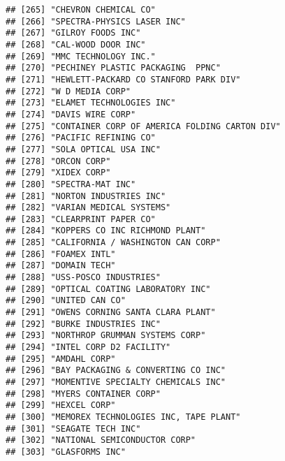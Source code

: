\documentclass[
]{book}
\begin{document}
\begin{verbatim}
## [265] "CHEVRON CHEMICAL CO"                                     
## [266] "SPECTRA-PHYSICS LASER INC"                               
## [267] "GILROY FOODS INC"                                        
## [268] "CAL-WOOD DOOR INC"                                       
## [269] "MMC TECHNOLOGY INC."                                     
## [270] "PECHINEY PLASTIC PACKAGING  PPNC"                        
## [271] "HEWLETT-PACKARD CO STANFORD PARK DIV"                    
## [272] "W D MEDIA CORP"                                          
## [273] "ELAMET TECHNOLOGIES INC"                                 
## [274] "DAVIS WIRE CORP"                                         
## [275] "CONTAINER CORP OF AMERICA FOLDING CARTON DIV"            
## [276] "PACIFIC REFINING CO"                                     
## [277] "SOLA OPTICAL USA INC"                                    
## [278] "ORCON CORP"                                              
## [279] "XIDEX CORP"                                              
## [280] "SPECTRA-MAT INC"                                         
## [281] "NORTON INDUSTRIES INC"                                   
## [282] "VARIAN MEDICAL SYSTEMS"                                  
## [283] "CLEARPRINT PAPER CO"                                     
## [284] "KOPPERS CO INC RICHMOND PLANT"                           
## [285] "CALIFORNIA / WASHINGTON CAN CORP"                        
## [286] "FOAMEX INTL"                                             
## [287] "DOMAIN TECH"                                             
## [288] "USS-POSCO INDUSTRIES"                                    
## [289] "OPTICAL COATING LABORATORY INC"                          
## [290] "UNITED CAN CO"                                           
## [291] "OWENS CORNING SANTA CLARA PLANT"                         
## [292] "BURKE INDUSTRIES INC"                                    
## [293] "NORTHROP GRUMMAN SYSTEMS CORP"                           
## [294] "INTEL CORP D2 FACILITY"                                  
## [295] "AMDAHL CORP"                                             
## [296] "BAY PACKAGING & CONVERTING CO INC"                       
## [297] "MOMENTIVE SPECIALTY CHEMICALS INC"                       
## [298] "MYERS CONTAINER CORP"                                    
## [299] "HEXCEL CORP"                                             
## [300] "MEMOREX TECHNOLOGIES INC, TAPE PLANT"                    
## [301] "SEAGATE TECH INC"                                        
## [302] "NATIONAL SEMICONDUCTOR CORP"                             
## [303] "GLASFORMS INC"                                           

\end{verbatim}
\end{document}
